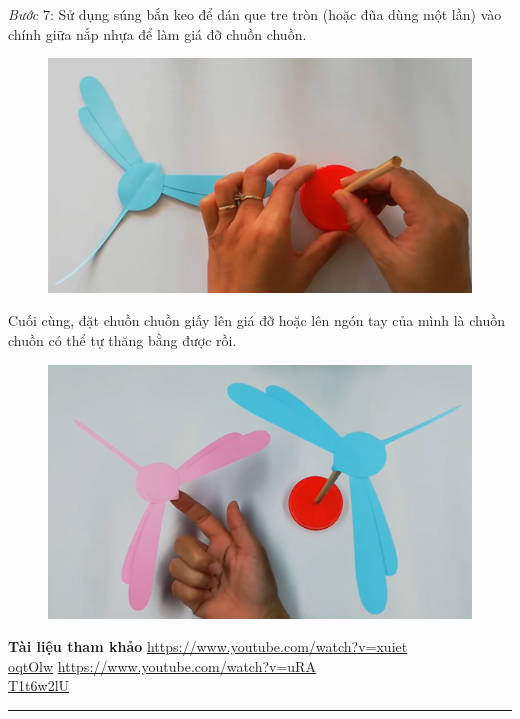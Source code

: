 \begin{multicols}{2}
\begin{figure}[H]
		\vspace*{-10pt}
	\end{figure}
	\textit{Bước} $7$: Sử dụng súng bắn keo để dán que tre tròn (hoặc đũa dùng một lần) vào chính giữa nắp nhựa để làm giá đỡ chuồn chuồn.
	\begin{figure}[H]
		\vspace*{5pt}
		\centering
		\captionsetup{labelformat= empty, justification=centering}
		\includegraphics[width=0.7\linewidth]{74}
		\vspace*{-10pt}
	\end{figure}
	Cuối cùng, đặt chuồn chuồn giấy lên giá đỡ hoặc lên ngón tay của mình là chuồn chuồn có thể tự thăng bằng được rồi.
	\begin{figure}[H]
		\vspace*{-5pt}
		\centering
		\captionsetup{labelformat= empty, justification=centering}
		\includegraphics[width=0.7\linewidth]{75}
		\vspace*{-10pt}
	\end{figure}
	\textbf{\color{toancuabi}Tài liệu tham khảo}
	\vskip 0.1cm
	\url{https://www.youtube.com/watch?v=xuiet}\\ \url{oqtOlw}
	\vskip 0.1cm
	\url{https://www.youtube.com/watch?v=uRA}\\ \url{T1t6w2lU}
\end{multicols}
\vspace*{-15pt}
{\color{toancuabi}\rule{1\linewidth}{0.1pt}}
\graphicspath{{../toancuabi/pic/}}
